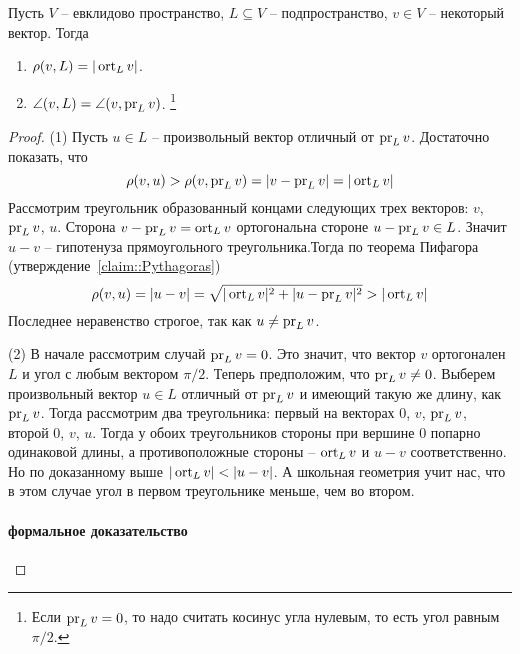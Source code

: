 \begin{claim}
\label{claim::DistAngle}
Пусть $V$ -- евклидово пространство, $L\subseteq V$ -- подпространство, $v\in V$ -- некоторый вектор.
Тогда
\begin{enumerate}
\item $\rho(v, L) = |\operatorname{ort}_L v|$.

\item $\angle(v, L) = \angle(v, \operatorname{pr}_L v)$.%
\footnote{Если $\operatorname{pr}_L v = 0$, то надо считать косинус угла нулевым, то есть угол равным $\pi/2$.}
\end{enumerate}
\end{claim}
\begin{proof}
(1) Пусть $u\in L$ -- произвольный вектор отличный от $\operatorname{pr}_L v$.
Достаточно показать, что 
\[
\rho(v, u) > \rho (v, \operatorname{pr}_Lv) = |v - \operatorname{pr}_Lv| = |\operatorname{ort}_L v|
\]
Рассмотрим треугольник образованный концами следующих трех векторов: $v$, $\operatorname{pr}_Lv$, $u$.
Сторона $v - \operatorname{pr}_Lv = \operatorname{ort}_L v$ ортогональна стороне $u - \operatorname{pr}_L v \in L$.
Значит $u - v$ -- гипотенуза прямоугольного треугольника.Тогда по теорема Пифагора (утверждение~\ref{claim::Pythagoras})
\[
\rho(v,u) = |u - v| = \sqrt{|\operatorname{ort}_Lv|^2 + |u - \operatorname{pr}_Lv|^2 }> |\operatorname{ort}_Lv|
\]
Последнее неравенство строгое, так как $u\neq \operatorname{pr}_Lv$.

(2) В начале рассмотрим случай $\operatorname{pr}_L v = 0$.
Это значит, что вектор $v$ ортогонален $L$ и угол с любым вектором $\pi/2$.
Теперь предположим, что $\operatorname{pr}_L v \neq 0$.
Выберем произвольный вектор $u\in L$ отличный от $\operatorname{pr}_L v$ и имеющий такую же длину, как $\operatorname{pr}_L v$.
Тогда рассмотрим два треугольника: первый на векторах $0$, $v$, $\operatorname{pr}_Lv$, второй $0$, $v$, $u$.
Тогда у обоих треугольников стороны при вершине $0$ попарно одинаковой длины, а противоположные стороны -- $\operatorname{ort}_L v$ и $u - v$ соответственно.
Но по доказанному выше $|\operatorname{ort}_L v| < |u - v|$.
А школьная геометрия учит нас, что в этом случае угол в первом треугольнике меньше, чем во втором.

\paragraph{формальное доказательство}


\end{proof}
